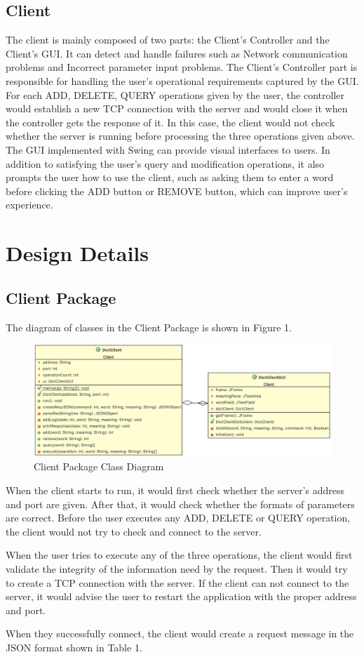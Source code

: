 \documentclass[a4paper]{article}
\begin{document}
\subsection{Client}
The client is mainly composed of two parts: the Client’s Controller and the Client’s GUI. It can detect and handle failures such as Network communication problems and Incorrect parameter input problems. The Client’s Controller part is responsible for handling the user’s operational requirements captured by the GUI. For each ADD, DELETE, QUERY operations given by the user, the controller would establish a new TCP connection with the server and would close it when the controller gets the response of it. In this case, the client would not check whether the server is running before processing the three operations given above. The GUI implemented with Swing can provide visual interfaces to users. In addition to satisfying the user’s query and modification operations, it also prompts the user how to use the client, such as asking them to enter a word before clicking the ADD button or REMOVE button, which can improve user’s experience.

\section{Design Details}
\subsection{Client Package}
The diagram of classes in the Client Package is shown in Figure 1.\\
\begin{figure}[H]
	\includegraphics[width=\linewidth]{ClientUML.png}
	\caption{Client Package Class Diagram}
\end{figure}
When the client starts to run, it would first check whether the server's address and port are given. After that, it would check whether the formats of parameters are correct. Before the user executes any ADD, DELETE or QUERY operation, the client would not try to check and connect to the server.\par
When the user tries to execute any of the three operations, the client would first validate the integrity of the information need by the request. Then it would try to create a TCP connection with the server. If the client can not connect to the server, it would advise the user to restart the application with the proper address and port. \par
When they successfully connect, the client would create a request message in the JSON format shown in Table 1.
\end{document}
